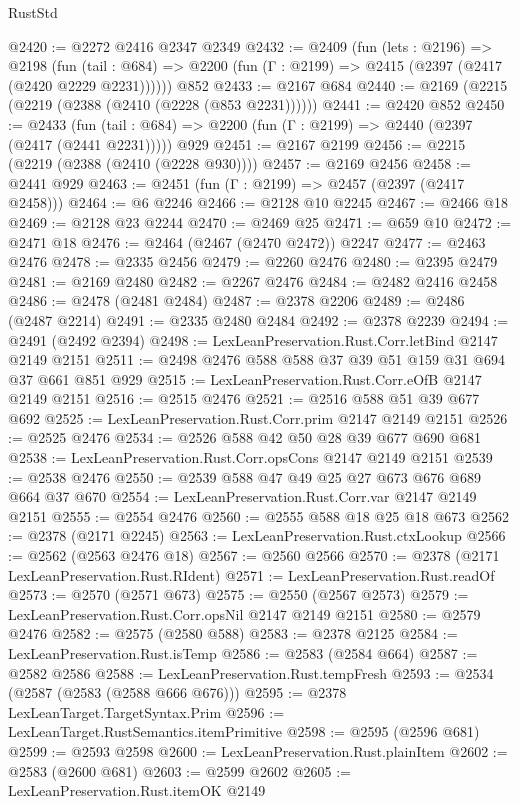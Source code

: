 \begin{lexlean}{RustStd}
\begin{coremodule}
@2420 := @2272 @2416 @2347 @2349
@2432 := @2409
    (fun (lets : @2196) =>
    @2198
      (fun (tail : @684) => @2200 (fun (Γ : @2199) => @2415 (@2397 (@2417 (@2420 @2229 @2231))))))
    @852
@2433 := @2167 @684
@2440 := @2169 (@2215 (@2219 (@2388 (@2410 (@2228 (@853 @2231))))))
@2441 := @2420 @852
@2450 := @2433
    (fun (tail : @684) => @2200 (fun (Γ : @2199) => @2440 (@2397 (@2417 (@2441 @2231)))))
    @929
@2451 := @2167 @2199
@2456 := @2215 (@2219 (@2388 (@2410 (@2228 @930))))
@2457 := @2169 @2456
@2458 := @2441 @929
@2463 := @2451 (fun (Γ : @2199) => @2457 (@2397 (@2417 @2458)))
@2464 := @6 @2246
@2466 := @2128 @10 @2245
@2467 := @2466 @18
@2469 := @2128 @23 @2244
@2470 := @2469 @25
@2471 := @659 @10
@2472 := @2471 @18
@2476 := @2464 (@2467 (@2470 @2472)) @2247
@2477 := @2463 @2476
@2478 := @2335 @2456
@2479 := @2260 @2476
@2480 := @2395 @2479
@2481 := @2169 @2480
@2482 := @2267 @2476
@2484 := @2482 @2416 @2458
@2486 := @2478 (@2481 @2484)
@2487 := @2378 @2206
@2489 := @2486 (@2487 @2214)
@2491 := @2335 @2480 @2484
@2492 := @2378 @2239
@2494 := @2491 (@2492 @2394)
@2498 := LexLeanPreservation.Rust.Corr.letBind @2147 @2149 @2151
@2511 := @2498 @2476 @588 @588 @37 @39 @51 @159 @31 @694 @37 @661 @851 @929
@2515 := LexLeanPreservation.Rust.Corr.eOfB @2147 @2149 @2151
@2516 := @2515 @2476
@2521 := @2516 @588 @51 @39 @677 @692
@2525 := LexLeanPreservation.Rust.Corr.prim @2147 @2149 @2151
@2526 := @2525 @2476
@2534 := @2526 @588 @42 @50 @28 @39 @677 @690 @681
@2538 := LexLeanPreservation.Rust.Corr.opsCons @2147 @2149 @2151
@2539 := @2538 @2476
@2550 := @2539 @588 @47 @49 @25 @27 @673 @676 @689 @664 @37 @670
@2554 := LexLeanPreservation.Rust.Corr.var @2147 @2149 @2151
@2555 := @2554 @2476
@2560 := @2555 @588 @18 @25 @18 @673
@2562 := @2378 (@2171 @2245)
@2563 := LexLeanPreservation.Rust.ctxLookup
@2566 := @2562 (@2563 @2476 @18)
@2567 := @2560 @2566
@2570 := @2378 (@2171 LexLeanPreservation.Rust.RIdent)
@2571 := LexLeanPreservation.Rust.readOf
@2573 := @2570 (@2571 @673)
@2575 := @2550 (@2567 @2573)
@2579 := LexLeanPreservation.Rust.Corr.opsNil @2147 @2149 @2151
@2580 := @2579 @2476
@2582 := @2575 (@2580 @588)
@2583 := @2378 @2125
@2584 := LexLeanPreservation.Rust.isTemp
@2586 := @2583 (@2584 @664)
@2587 := @2582 @2586
@2588 := LexLeanPreservation.Rust.tempFresh
@2593 := @2534 (@2587 (@2583 (@2588 @666 @676)))
@2595 := @2378 LexLeanTarget.TargetSyntax.Prim
@2596 := LexLeanTarget.RustSemantics.itemPrimitive
@2598 := @2595 (@2596 @681)
@2599 := @2593 @2598
@2600 := LexLeanPreservation.Rust.plainItem
@2602 := @2583 (@2600 @681)
@2603 := @2599 @2602
@2605 := LexLeanPreservation.Rust.itemOK @2149

\end{coremodule}
\end{lexlean}
